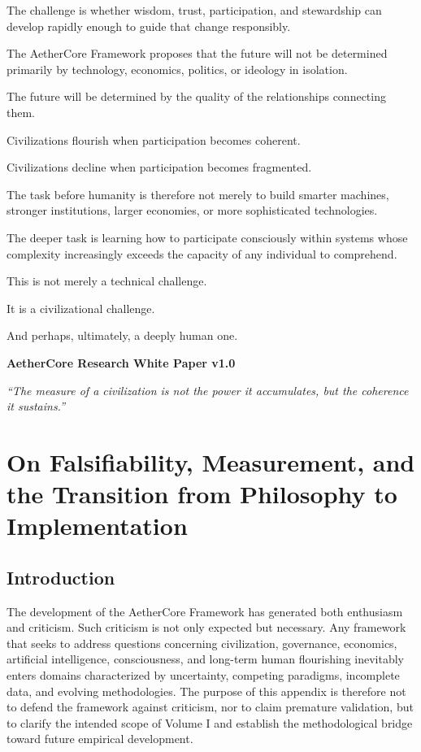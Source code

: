 \documentclass[12pt]{article}
\begin{document}
The challenge is whether wisdom, trust, participation, and stewardship can develop rapidly enough to guide that change responsibly.

The AetherCore Framework proposes that the future will not be determined primarily by technology, economics, politics, or ideology in isolation.

The future will be determined by the quality of the relationships connecting them.

Civilizations flourish when participation becomes coherent.

Civilizations decline when participation becomes fragmented.

The task before humanity is therefore not merely to build smarter machines, stronger institutions, larger economies, or more sophisticated technologies.

The deeper task is learning how to participate consciously within systems whose complexity increasingly exceeds the capacity of any individual to comprehend.

This is not merely a technical challenge.

It is a civilizational challenge.

And perhaps, ultimately, a deeply human one.

\vspace{1.5em}

\begin{center}
\textbf{AetherCore Research White Paper v1.0}

\vspace{0.75em}

\emph{``The measure of a civilization is not the power it accumulates, but the coherence it sustains.''}
\end{center}

\appendix

\section{On Falsifiability, Measurement, and the Transition from Philosophy to Implementation}

\subsection{Introduction}

The development of the AetherCore Framework has generated both enthusiasm and criticism. Such criticism is not only expected but necessary. Any framework that seeks to address questions concerning civilization, governance, economics, artificial intelligence, consciousness, and long-term human flourishing inevitably enters domains characterized by uncertainty, competing paradigms, incomplete data, and evolving methodologies. The purpose of this appendix is therefore not to defend the framework against criticism, nor to claim premature validation, but to clarify the intended scope of Volume I and establish the methodological bridge toward future empirical development.
\end{document}
